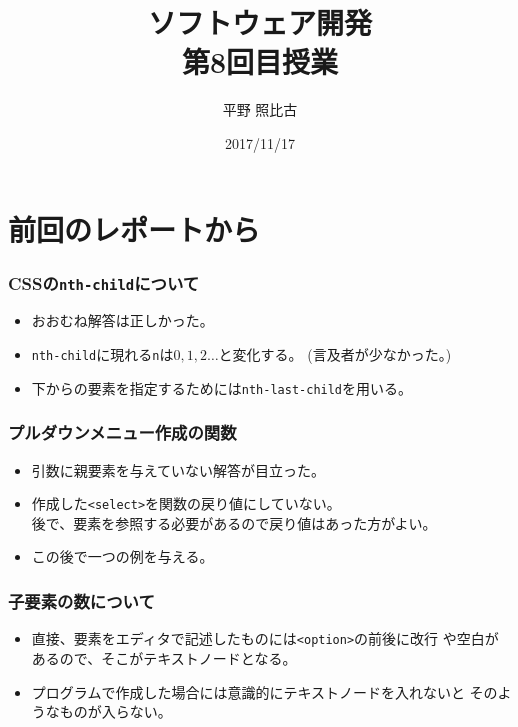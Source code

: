
\title{ソフトウェア開発\\第8回目授業}
\author{平野 照比古}
\institute{}
\date{2017/11/17}
\newtheorem{Prob}{解説}
\newcommand{\Elm}[1]{\texttt{<#1>}}

\newcommand{\DOMM}{\texttt}
\newcommand{\Event}{\texttt}
\newcommand{\DOMP}{\texttt}
\newcommand{\DOM}{\texttt{DOM}}
\newcommand{\keyitem}{\relax}
\newcommand{\HTML}{HTML文書}

\frame{\maketitle}
\section{前回のレポートから}
 \begin{frame}[containsverbatim]
  \frametitle{CSSの\protect\texttt{nth-child}について}
  \begin{itemize}
   \item おおむね解答は正しかった。
   \item \texttt{nth-child}に現れる\texttt{n}は$0,1,2\dots$と変化する。
         (言及者が少なかった。)
   \item 下からの要素を指定するためには\texttt{nth-last-child}を用いる。
  \end{itemize}
 \end{frame}
 \begin{frame}[containsverbatim]
  \frametitle{プルダウンメニュー作成の関数}
\begin{itemize}
 \item 引数に親要素を与えていない解答が目立った。
 \item 作成した\Elm{select}を関数の戻り値にしていない。\\
       後で、要素を参照する必要があるので戻り値はあった方がよい。
 \item この後で一つの例を与える。
\end{itemize}
 \end{frame}
 \begin{frame}[containsverbatim]
   \frametitle{子要素の数について}
   \begin{itemize}
    \item 直接、要素をエディタで記述したものには\Elm{option}の前後に改行
          や空白があるので、そこがテキストノードとなる。
    \item プログラムで作成した場合には意識的にテキストノードを入れないと
          そのようなものが入らない。
   \end{itemize}
\end{frame}

